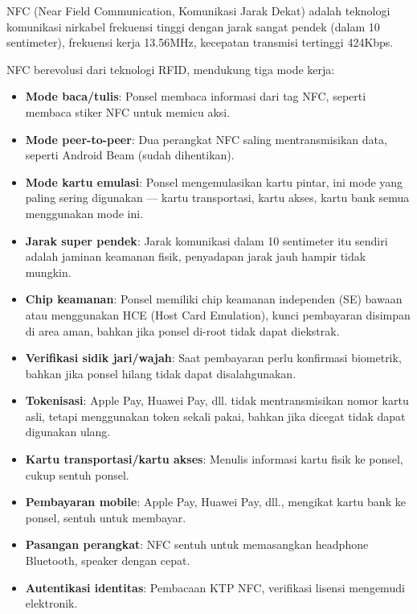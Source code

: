 
NFC (Near Field Communication, Komunikasi Jarak Dekat) adalah teknologi komunikasi nirkabel frekuensi tinggi dengan jarak sangat pendek (dalam 10 sentimeter), frekuensi kerja 13.56MHz, kecepatan transmisi tertinggi 424Kbps.


NFC berevolusi dari teknologi RFID, mendukung tiga mode kerja:

\begin{itemize}
  \item \textbf{Mode baca/tulis}: Ponsel membaca informasi dari tag NFC, seperti membaca stiker NFC untuk memicu aksi.
  \item \textbf{Mode peer-to-peer}: Dua perangkat NFC saling mentransmisikan data, seperti Android Beam (sudah dihentikan).
  \item \textbf{Mode kartu emulasi}: Ponsel mengemulasikan kartu pintar, ini mode yang paling sering digunakan — kartu transportasi, kartu akses, kartu bank semua menggunakan mode ini.
\end{itemize}


\begin{itemize}
  \item \textbf{Jarak super pendek}: Jarak komunikasi dalam 10 sentimeter itu sendiri adalah jaminan keamanan fisik, penyadapan jarak jauh hampir tidak mungkin.
  \item \textbf{Chip keamanan}: Ponsel memiliki chip keamanan independen (SE) bawaan atau menggunakan HCE (Host Card Emulation), kunci pembayaran disimpan di area aman, bahkan jika ponsel di-root tidak dapat diekstrak.
  \item \textbf{Verifikasi sidik jari/wajah}: Saat pembayaran perlu konfirmasi biometrik, bahkan jika ponsel hilang tidak dapat disalahgunakan.
  \item \textbf{Tokenisasi}: Apple Pay, Huawei Pay, dll. tidak mentransmisikan nomor kartu asli, tetapi menggunakan token sekali pakai, bahkan jika dicegat tidak dapat digunakan ulang.
\end{itemize}


\begin{itemize}
  \item \textbf{Kartu transportasi/kartu akses}: Menulis informasi kartu fisik ke ponsel, cukup sentuh ponsel.
  \item \textbf{Pembayaran mobile}: Apple Pay, Huawei Pay, dll., mengikat kartu bank ke ponsel, sentuh untuk membayar.
  \item \textbf{Pasangan perangkat}: NFC sentuh untuk memasangkan headphone Bluetooth, speaker dengan cepat.
  \item \textbf{Autentikasi identitas}: Pembacaan KTP NFC, verifikasi lisensi mengemudi elektronik.
\end{itemize}

